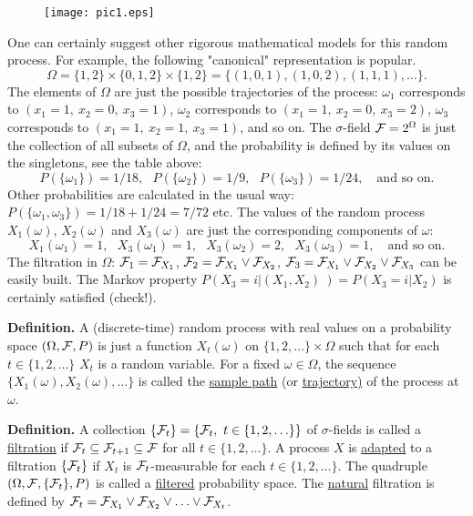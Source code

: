 \documentclass[a4paper,10pt]{article}
\newcommand{\1}[1]{\mathbf{1}_{\{#1\}}}
\begin{document}
\begin{figure}[htbp]
\begin{center}
\texttt{[image: pic1.eps]}
\end{center}
\end{figure}

One can certainly suggest other rigorous mathematical models for this random process. For example, the following "canonical" representation is popular.
$$\Omega=\{1,2\}\times\{0,1,2\}\times\{1,2\}=\{(1,0,1),(1,0,2),(1,1,1),\ldots\}.$$
The elements of $\Omega$ are just the possible trajectories of the process: $\omega_1$ corresponds to $(x_1=1,~x_2=0,~x_3=1)$,  $\omega_2$ corresponds to $(x_1=1,~x_2=0,~x_3=2)$, $\omega_3$ corresponds to $(x_1=1,~x_2=1,~x_3=1)$, and so on. The $\sigma$-field ${\cal F}=2^\Omega$ is just the collection of all subsets of $\Omega$, and the probability is defined by its values on the singletons, see the table above:
$$P(\{\omega_1\})=1/18,~~~P(\{\omega_2\})=1/9,~~~P(\{\omega_3\})=1/24,~~~\mbox{ and so on.}$$
Other probabilities are calculated in the usual way: $P(\{\omega_1,\omega_3\})=1/18+1/24=7/72$ etc. The values of the random process $X_1(\omega)$, $X_2(\omega)$ and $X_3(\omega)$ are just the corresponding components of $\omega$:
$$X_1(\omega_1)=1,~~~X_3(\omega_1)=1,~~~X_3(\omega_2)=2,~~~X_3(\omega_3)=1,~~~ \mbox{ and so on.}$$
The filtration in $\Omega$: ${\cal F}_1={\cal F}_{X_1}$, ${\cal F}_2={\cal F}_{X_1}\vee{\cal F}_{X_2}$,  ${\cal F}_3={\cal F}_{X_1}\vee{\cal F}_{X_2}\vee{\cal F}_{X_3}$ can be easily built. The Markov property $P(X_3=i|(X_1,X_2)~)=P(X_3=i|X_2)$ is certainly satisfied (check!).

{\bf Definition.} A (discrete-time) random process with real values on a probability space $(\Omega,{\cal F},P)$ is just a function $X_t(\omega)$ on $\{1,2,\ldots\}\times\Omega$ such that for each $t\in\{1,2,\ldots\}$ $X_t$ is a random variable. For a fixed $\omega\in\Omega$, the sequence $\{X_1(\omega),X_2(\omega),\ldots\}$ is called the \underline{sample path} (or \underline{trajectory)} of the process at $\omega$.

{\bf Definition.} A collection $\{{\cal F}_t\}=\{{\cal F}_t,~t\in\{1,2,\ldots\}\}$ of $\sigma$-fields is called a \underline{filtration} if ${\cal F}_t\subseteq{\cal F}_{t+1}\subseteq{\cal F}$ for all $t\in\{1,2,\ldots\}$. A process $X$ is \underline{adapted} to a filtration $\{{\cal F}_t\}$ if $X_t$ is ${\cal F}_t$-measurable for each $t\in\{1,2,\ldots\}$. The quadruple $(\Omega,{\cal F},\{{\cal F}_t\},P)$ is called a \underline{filtered} probability space. The \underline{natural} filtration is defined by ${\cal F}_t={\cal F}_{X_1}\vee{\cal F}_{X_2}\vee\ldots \vee{\cal F}_{X_t}$.
\end{document}
